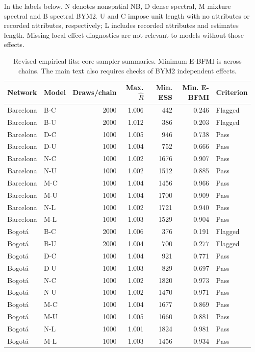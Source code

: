 \documentclass[11pt]{article}
\begin{document}
In the labels below, N denotes nonspatial NB, D dense spectral, M mixture spectral and B spectral BYM2. U and C impose unit length with no attributes or recorded attributes, respectively; L includes recorded attributes and estimates length. Missing local-effect diagnostics are not relevant to models without those effects.
\begin{table}[!htbp]\centering\small
\caption{Revised empirical fits: core sampler summaries. Minimum E-BFMI is across chains. The main text also requires checks of BYM2 independent effects.}
\begin{tabular}{llrrrrl}\toprule Network & Model & Draws/chain & Max. $\widehat R$ & Min. ESS & Min. E-BFMI & Criterion\\\midrule
Barcelona & B-C & 2000 & 1.006 & 442 & 0.246 & Flagged \\
Barcelona & B-U & 2000 & 1.012 & 386 & 0.203 & Flagged \\
Barcelona & D-C & 1000 & 1.005 & 946 & 0.738 & Pass \\
Barcelona & D-U & 1000 & 1.004 & 752 & 0.666 & Pass \\
Barcelona & N-C & 1000 & 1.002 & 1676 & 0.907 & Pass \\
Barcelona & N-U & 1000 & 1.002 & 1512 & 0.885 & Pass \\
Barcelona & M-C & 1000 & 1.004 & 1456 & 0.966 & Pass \\
Barcelona & M-U & 1000 & 1.004 & 1700 & 0.909 & Pass \\
Barcelona & N-L & 1000 & 1.002 & 1721 & 0.940 & Pass \\
Barcelona & M-L & 1000 & 1.003 & 1529 & 0.904 & Pass \\
Bogot\'a & B-C & 2000 & 1.006 & 376 & 0.191 & Flagged \\
Bogot\'a & B-U & 2000 & 1.004 & 700 & 0.277 & Flagged \\
Bogot\'a & D-C & 1000 & 1.004 & 921 & 0.771 & Pass \\
Bogot\'a & D-U & 1000 & 1.003 & 829 & 0.697 & Pass \\
Bogot\'a & N-C & 1000 & 1.002 & 1820 & 0.973 & Pass \\
Bogot\'a & N-U & 1000 & 1.002 & 1470 & 0.971 & Pass \\
Bogot\'a & M-C & 1000 & 1.004 & 1677 & 0.869 & Pass \\
Bogot\'a & M-U & 1000 & 1.005 & 1660 & 0.881 & Pass \\
Bogot\'a & N-L & 1000 & 1.001 & 1824 & 0.981 & Pass \\
Bogot\'a & M-L & 1000 & 1.003 & 1456 & 0.934 & Pass \\
\bottomrule\end{tabular}\end{table}
\end{document}
